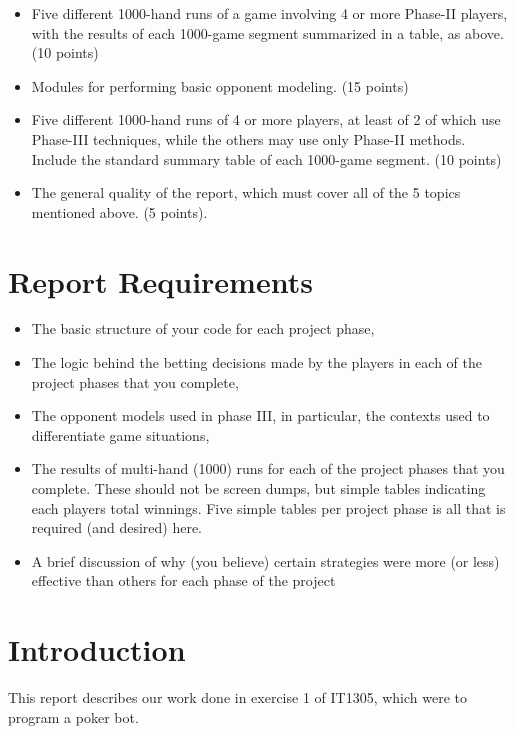 \documentclass[titlepage]{article}
\begin{document}
\begin{itemize}
\begin{itemize}
\item Five different 1000-hand runs of a game involving 4 or more Phase-II players, with the results of each 1000-game segment summarized in a table, as above. (10 points)

\item Modules for performing basic opponent modeling. (15 points)

\item Five different 1000-hand runs of 4 or more players, at least of 2 of which use Phase-III techniques, while the others may use only Phase-II methods. Include the standard summary table of each 1000-game segment. (10 points)

\item The general quality of the report, which must cover all of the 5 topics mentioned above. (5 points).
\end{itemize}

\section*{Report Requirements}
\begin{itemize}
\item The basic structure of your code for each project phase,

\item The logic behind the betting decisions made by the players in each of the project phases that you complete,

\item The opponent models used in phase III, in particular, the contexts used to differentiate game situations,

\item The results of multi-hand (1000) runs for each of the project phases that you complete. These should not be screen dumps, but simple tables indicating each players total winnings. Five simple tables per project phase is all that is required (and desired) here.

\item A brief discussion of why (you believe) certain strategies were more (or less) effective than others for
each phase of the project
\end{itemize}

\newpage

\section{Introduction}
	This report describes our work done in exercise 1 of IT1305, which were to program a poker bot. 
	

\end{itemize}
\end{document}
